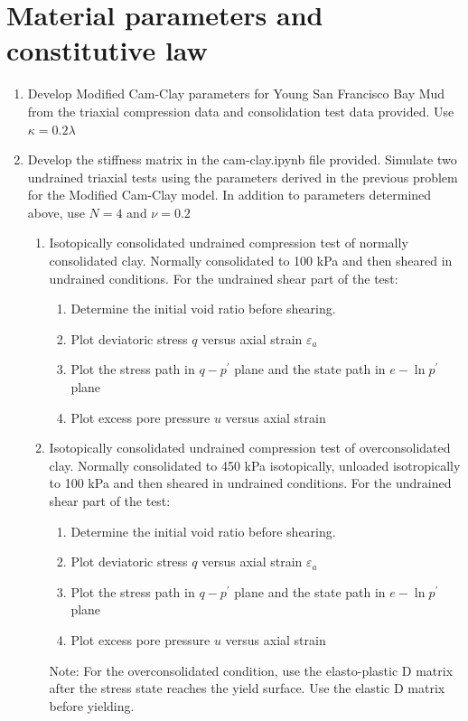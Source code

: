 \documentclass[a4paper,12pt]{article}
\begin{document}
\section{Material parameters and constitutive law}	
	\begin{enumerate}
	\item Develop Modified Cam-Clay parameters for Young San Francisco Bay Mud from the triaxial compression data and consolidation test data provided. Use $\kappa = 0.2 \lambda$
	
	\item Develop the stiffness matrix in the cam-clay.ipynb file provided. Simulate two undrained triaxial tests using the parameters derived in the previous problem for the Modified Cam-Clay model. In addition to parameters determined above, use $N = 4$  and $\nu = 0.2$
	
	\begin{enumerate}
		\item Isotopically consolidated undrained compression test of normally consolidated clay.
		Normally consolidated to 100 kPa and then sheared in undrained conditions. For the undrained shear part of the test:
		\begin{enumerate}
			\item Determine the initial void ratio before shearing.
			\item Plot deviatoric stress $q$ versus axial strain $\varepsilon_a$
			\item Plot the stress path in $q-p^\prime$ plane and the state path in $e - \ln p^\prime$ plane
			\item Plot excess pore pressure $u$ versus axial strain
		\end{enumerate}
		
		\item Isotopically consolidated undrained compression test of overconsolidated clay.
		Normally consolidated to 450 kPa isotopically, unloaded isotropically to 100 kPa
		and then sheared in undrained conditions. For the undrained shear part of the test:
		\begin{enumerate}
			\item Determine the initial void ratio before shearing.
			\item Plot deviatoric stress $q$ versus axial strain $\varepsilon_a$
			\item Plot the stress path in $q-p^\prime$ plane and the state path in $e - \ln p^\prime$ plane
			\item Plot excess pore pressure $u$ versus axial strain
		\end{enumerate}
		Note: For the overconsolidated condition, use the elasto-plastic D matrix after the stress state reaches the yield surface. Use the elastic D matrix before yielding.
	\end{enumerate}
	\end{enumerate}
\end{document}
